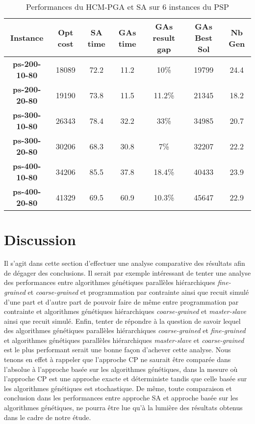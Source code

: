 	\begin{table}[h]
		\centering
		\begin{tabular}{|c|c|c|c|c|c|c|}
			\hline
			\textbf{Instance} & \textbf{Opt cost} & \textbf{SA time} & \textbf{GAs time} & \textbf{GAs result gap} & \textbf{GAs Best Sol} & \textbf{Nb Gen}\\
			\hline
			\textbf{ps-200-10-80} & 18089 & 72.2 & 11.2 & 10\% & 19799 & 24.4 \\
			\textbf{ps-200-20-80} & 19190 & 73.8 & 11.5 & 11.2\% & 21345 & 18.2 \\
			\textbf{ps-300-10-80} & 26343 & 78.4 & 32.2 & 33\% & 34985 & 20.7 \\
			\textbf{ps-300-20-80} & 30206 & 68.3 & 30.8 & 7\% & 32207 & 22.2 \\
			\textbf{ps-400-10-80} & 34206 & 85.5 & 37.8 & 18.4\% & 40433 & 23.9 \\
			\textbf{ps-400-20-80} & 41329 & 69.5 & 60.9 & 10.3\% & 45647 & 22.9 \\
			\hline
		\end{tabular}	
		\caption{Performances du HCM-PGA et SA sur 6 instances du PSP}	
		\label{tab:hcm_pga_sa}	
	\end{table}					
	
		\section{Discussion}
		Il s'agit dans cette section d'effectuer une analyse comparative des résultats afin de dégager des conclusions. Il serait par exemple intéressant de tenter une analyse des performances entre algorithmes génétiques parallèles hiérarchiques \emph{fine-grained} et \emph{coarse-grained} et programmation par contrainte ainsi que recuit simulé d'une part et d'autre part de pouvoir faire de même entre programmation par contrainte et algorithmes génétiques hiérarchiques \emph{coarse-grained} et \emph{master-slave} ainsi que recuit simulé. Enfin, tenter de répondre à la question de savoir lequel des algorithmes génétiques parallèles hiérarchiques \emph{coarse-grained} et \emph{fine-grained} et algorithmes génétiques parallèles hiérarchiques \emph{master-slave} et \emph{coarse-grained} est le plus performant serait une bonne façon d'achever cette analyse. Nous tenons en effet à rappeler que l'approche CP ne saurait être comparée dans l'absolue à l'approche basée sur les algorithmes génétiques, dans la mesure où l'approche CP est une approche exacte et déterministe tandis que celle basée sur les algorithmes génétiques est stochastique. De même, toute comparaison et conclusion dans les performances entre approche SA et approche basée sur les algorithmes génétiques, ne pourra être lue qu'à la lumière des résultats obtenus dans le cadre de notre étude.
		
